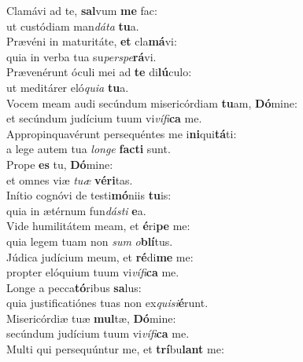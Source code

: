 \evenverse Clamávi ad te, \textbf{sal}vum \textbf{me} fac:~\*\\
\evenverse ut custódiam man\textit{dá}\textit{ta} \textbf{tu}a.\\
\oddverse Prævéni in maturitáte, \textbf{et} cla\textbf{má}vi:~\*\\
\oddverse quia in verba tua su\textit{per}\textit{spe}\textbf{rá}vi.\\
\evenverse Prævenérunt óculi mei ad \textbf{te} di\textbf{lú}culo:~\*\\
\evenverse ut meditárer eló\textit{qui}\textit{a} \textbf{tu}a.\\
\oddverse Vocem meam audi secúndum misericórdiam \textbf{tu}am, \textbf{Dó}mine:~\*\\
\oddverse et secúndum judícium tuum vi\textit{ví}\textit{fi}\textbf{ca} me.\\
\evenverse Appropinquavérunt persequéntes me i\textbf{ni}qui\textbf{tá}ti:~\*\\
\evenverse a lege autem tua \textit{lon}\textit{ge} \textbf{fa}\textbf{cti} sunt.\\
\oddverse Prope \textbf{es} tu, \textbf{Dó}mine:~\*\\
\oddverse et omnes viæ \textit{tu}\textit{æ} \textbf{vé}\textbf{ri}tas.\\
\evenverse Inítio cognóvi de testi\textbf{mó}niis \textbf{tu}is:~\*\\
\evenverse quia in ætérnum fun\textit{dá}\textit{sti} \textbf{e}a.\\
\oddverse Vide humilitátem meam, et \textbf{é}ri\textbf{pe} me:~\*\\
\oddverse quia legem tuam non \textit{sum} \textit{o}\textbf{blí}tus.\\
\evenverse Júdica judícium meum, et \textbf{ré}di\textbf{me} me:~\*\\
\evenverse propter elóquium tuum vi\textit{ví}\textit{fi}\textbf{ca} me.\\
\oddverse Longe a pecca\textbf{tó}ribus \textbf{sa}lus:~\*\\
\oddverse quia justificatiónes tuas non ex\textit{qui}\textit{si}\textbf{é}runt.\\
\evenverse Misericórdiæ tuæ \textbf{mul}tæ, \textbf{Dó}mine:~\*\\
\evenverse secúndum judícium tuum vi\textit{ví}\textit{fi}\textbf{ca} me.\\
\oddverse Multi qui persequúntur me, et \textbf{trí}bu\textbf{lant} me:~\*\\
